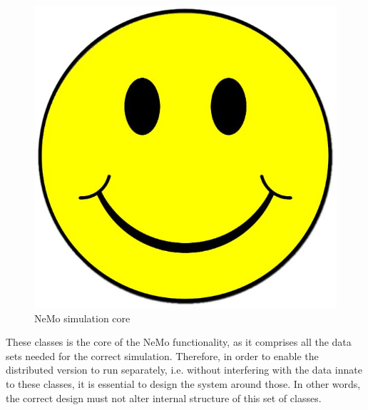 \begin{figure}[h]
\begin{center}
\includegraphics[scale = 0.1]{images/placeholder.jpg}
\end{center}
\caption{NeMo simulation core}
\end{figure}

These classes is the core of the NeMo functionality, as it comprises all the data sets needed for the correct simulation. Therefore, in order to enable the distributed version to run separately, i.e. without interfering with the data innate to these classes, it is essential to design the system around those. In other words, the correct design must not alter internal structure of this set of classes.

